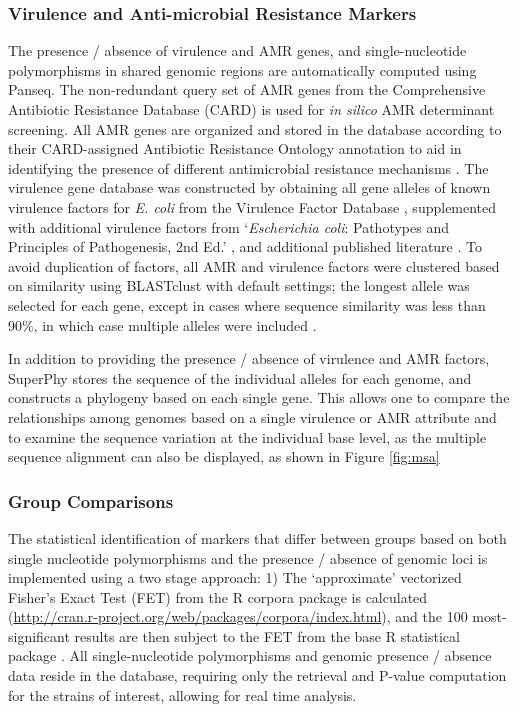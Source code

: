 \documentclass[doublespacing, linenumbers]{bmcart}
\begin{document}
\subsubsection{Virulence and Anti-microbial Resistance Markers}
The presence / absence of virulence and AMR genes, and single-nucleotide polymorphisms in shared genomic regions are automatically computed using Panseq. The non-redundant query set of AMR genes from the Comprehensive Antibiotic Resistance Database (CARD) \cite{mcarthur_comprehensive_2013} is used for \textit{in silico} AMR determinant screening. All AMR genes are organized and stored in the database according to their CARD-assigned Antibiotic Resistance Ontology annotation to aid in identifying the presence of different antimicrobial resistance mechanisms . The virulence gene database was constructed by obtaining all gene alleles of known virulence factors for \textit{E. coli} from the Virulence Factor Database \cite{chen_vfdb_2011}, supplemented with additional virulence factors from `\textit{Escherichia coli}: Pathotypes and Principles of Pathogenesis, 2nd Ed.' , and additional published literature \cite{donnenberg_escherichia_2013}. To avoid duplication of factors, all AMR and virulence factors were clustered based on similarity using BLASTclust with default settings; the longest allele was selected for each gene, except in cases where sequence similarity was less than 90\%, in which case multiple alleles were included \cite{altschul_gapped_1997}.

In addition to providing the presence / absence of virulence and AMR factors, SuperPhy stores the sequence of the individual alleles for each genome, and constructs a phylogeny based on each single gene. This allows one to compare the relationships among genomes based on a single virulence or AMR attribute and to examine the sequence variation at the individual base level, as the multiple sequence alignment can also be displayed, as shown in Figure \ref{fig:msa}

\subsubsection{Group Comparisons}
The statistical identification of markers that differ between groups based on both single nucleotide polymorphisms and the presence / absence of genomic loci is implemented using a two stage approach: 1) The `approximate' vectorized Fisher’s Exact Test (FET) from the R corpora package is calculated (\url{http://cran.r-project.org/web/packages/corpora/index.html}), and the 100 most-significant results are then subject to the FET from the base R statistical package \cite{r_foundation_for_statistical_computing_r:_2005}. All single-nucleotide polymorphisms and genomic presence / absence data reside in the database, requiring only the retrieval and P-value computation for the strains of interest, allowing for real time analysis.
\end{document}
